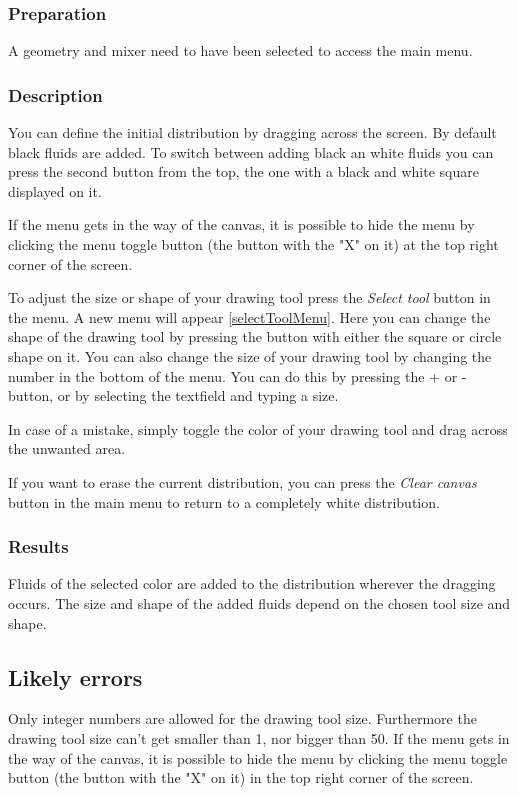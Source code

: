 \subsubsection{Preparation}
A geometry and mixer need to have been selected to access the main menu.

\subsubsection{Description}
You can define the initial distribution by dragging across the screen. By default black fluids are added. To switch between adding black an white fluids you can press the second button from the top, the one with a black and white square displayed on it.

If the menu gets in the way of the canvas, it is possible to hide the menu by clicking the menu toggle button (the button with the "X" on it) at the top right corner of the screen.

 To adjust the size or shape of your drawing tool press the \emph{Select tool} button in the menu. A new menu will appear \ref{selectToolMenu}. Here you can change the shape of the drawing tool by pressing the button with either the square or circle shape on it. You can also change the size of your drawing tool by changing the number in the bottom of the menu. You can do this by pressing the + or - button, or by selecting the textfield and typing a size.


In case of a mistake, simply toggle the color of your drawing tool and drag across the unwanted area.

If you want to erase the current distribution, you can press the \emph{Clear canvas} button in the main menu to return to a completely white distribution.

\subsubsection{Results}
Fluids of the selected color are added to the distribution wherever the dragging occurs. The size and shape of the added fluids depend on the chosen tool size and shape.

\subsection{Likely errors}
Only integer numbers are allowed for the drawing tool size. Furthermore the drawing tool size can't get smaller than 1, nor bigger than 50. If the menu gets in the way of the canvas, it is possible to hide the menu by clicking the menu toggle button (the button with the "X" on it) in the top right corner of the screen.

